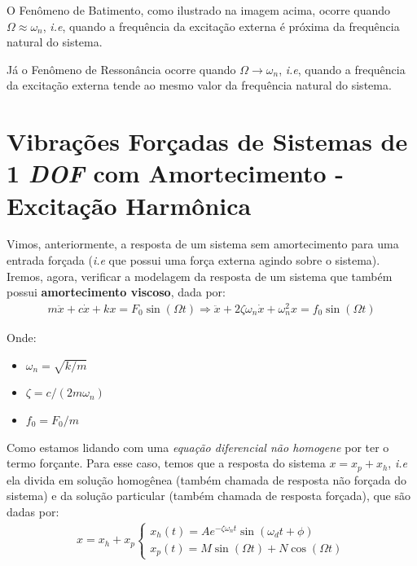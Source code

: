 \documentclass{article}
\begin{document}
                O Fenômeno de Batimento, como ilustrado na imagem acima, ocorre quando $\Omega \approx \omega_n$, \emph{i.e}, quando a frequência da excitação externa é próxima da frequência natural
                do sistema.

                Já o Fenômeno de Ressonância ocorre quando $\Omega \rightarrow \omega_n$, \emph{i.e}, quando a  frequência da excitação externa tende ao mesmo valor da frequência natural do sistema.
            



                \newpage
        \section{Vibrações Forçadas de Sistemas de 1 \emph{DOF} com Amortecimento - Excitação Harmônica}
            Vimos, anteriormente, a resposta de um sistema sem amortecimento para uma entrada forçada (\emph{i.e} que possui uma força externa agindo sobre o sistema). Iremos, agora, verificar a modelagem
            da resposta de um sistema que também possui \textbf{amortecimento viscoso}, dada por:
            \begin{align}
                m\ddot x + c\dot x + kx = F_0\sin(\Omega t) \Rightarrow \ddot x + 2 \zeta \omega_n \dot x + \omega_n^2 x = f_0 \sin(\Omega t) \label{eq:vib_forcada_amortecida_1dof}
            \end{align}

            Onde:
            \begin{itemize}
                \item $\omega_n = \sqrt{k/m}$
                \item $\zeta = c/(2m\omega_n)$
                \item $f_0=F_0/m$
            \end{itemize}

            Como estamos lidando com uma \emph{equação diferencial não homogene} por ter o termo forçante. Para esse caso, temos que a resposta do sistema $x = x_p + x_h$, \emph{i.e} ela divida em solução
            homogênea (também chamada de resposta não forçada do sistema) e da solução particular (também chamada de resposta forçada), que são dadas por:
            \begin{align}
                x = x_h + x_p\begin{cases}x_h(t) = Ae^{-\zeta \omega_n t} \sin(\omega_d t + \phi) \\ x_p(t) = M\sin(\Omega t) + N \cos{(\Omega t)}\end{cases}
            \end{align}
\end{document}
